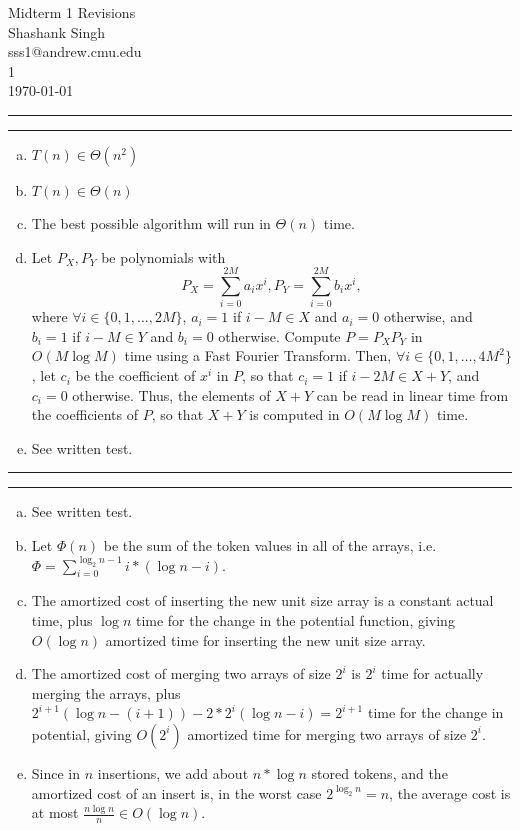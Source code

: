 \documentclass[11pt]{article}
\makeatletter
\newcounter{questionCounter}
\newcounter{partCounter}[questionCounter]
\newenvironment{question}[2][\arabic{questionCounter}]{%
    \setcounter{partCounter}{0}%
    \vspace{.25in} \hrule \vspace{0.5em}%
        \noindent{\bf #2}%
    \vspace{0.8em} \hrule \vspace{.10in}%
    \addtocounter{questionCounter}{1}%
}{}
\newcommand{\myname}{Shashank Singh}
\newcommand{\myandrew}{sss1@andrew.cmu.edu}
\newcommand{\myhwname}{Midterm 1 Revisions}
\newcommand{\myrecitation}{1}
\makeatother
\begin{document}
\thispagestyle{plain}

{\Large \myhwname} \\
\myname \\
\myandrew \\
\myrecitation \\
\today
\begin{question}{Problem 1}
\begin{enumerate}[(a)]
\item $T(n) \in \Theta(n^2)$

\item $T(n) \in \Theta(n)$

\item The best possible algorithm will run in $\Theta(n)$ time.

\item Let $P_X,P_Y$ be polynomials with
\[P_X = \sum_{i = 0}^{2M} a_i x^i,
P_Y = \sum_{i = 0}^{2M} b_i x^i,\]
where $\forall i \in \{0,1,\ldots,2M\}$, $a_i = 1$ if $i - M \in X$ and
$a_i = 0$ otherwise, and $b_i = 1$ if $i - M \in Y$ and $b_i = 0$ otherwise.
Compute $P = P_XP_Y$ in $O(M \log M)$ time using a Fast Fourier Transform.
Then, $\forall i \in \{0,1,\ldots,4M^2\}$, let $c_i$ be the coefficient of
$x^i$ in $P$, so that $c_i = 1$ if $i - 2M \in X + Y$, and $c_i = 0$
otherwise. Thus, the elements of $X + Y$ can be read in linear time from the
coefficients of $P$, so that $X + Y$ is computed in $O(M \log M)$ time.

\item See written test.
\end{enumerate}
\end{question}

\begin{question}{Problem 2}
\begin{enumerate}[(a)]
\item See written test.

\item Let $\Phi(n)$ be the sum of the token values in all of the arrays,
i.e. $\Phi = \sum_{i = 0}^{\log_2 n - 1} i * (\log n - i)$.

\item The amortized cost of inserting the new unit size array is a constant
actual time, plus $\log n$ time for the change in the potential function,
giving $O(\log n)$ amortized time for inserting the new unit size array.

\item The amortized cost of merging two arrays of size $2^i$ is $2^i$ time for
actually merging the arrays, plus
$2^{i + 1} (\log n - (i + 1)) - 2 * 2^i (\log n - i) = 2^{i + 1}$ time for the
change in potential, giving $O(2^i)$ amortized time for merging two arrays of
size $2^i$.

\item Since in $n$ insertions, we add about $n * \log n$ stored tokens, and
the amortized cost of an insert is, in the worst case $2^{\log_2 n} = n$, the
average cost is at most $\frac{n \log n}{n} \in O(\log n)$.
\end{enumerate}
\end{question}
\end{document}
